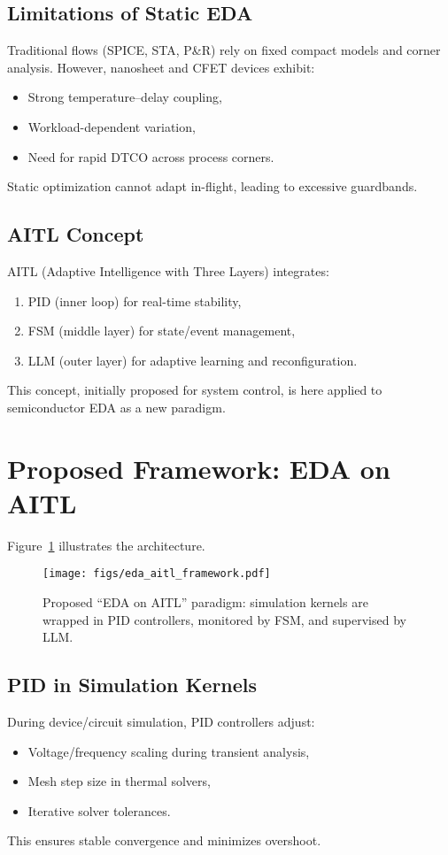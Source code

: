 \documentclass[conference]{IEEEtran}
\begin{document}
\subsection{Limitations of Static EDA}
Traditional flows (SPICE, STA, P\&R) rely on fixed compact models and corner analysis. 
However, nanosheet and CFET devices exhibit:
\begin{itemize}
  \item Strong temperature–delay coupling,
  \item Workload-dependent variation,
  \item Need for rapid DTCO across process corners.
\end{itemize}
Static optimization cannot adapt in-flight, leading to excessive guardbands.

\subsection{AITL Concept}
AITL (Adaptive Intelligence with Three Layers) integrates:
\begin{enumerate}
  \item PID (inner loop) for real-time stability,
  \item FSM (middle layer) for state/event management,
  \item LLM (outer layer) for adaptive learning and reconfiguration.
\end{enumerate}
This concept, initially proposed for system control, 
is here applied to semiconductor EDA as a new paradigm.

\section{Proposed Framework: EDA on AITL}
Figure~\ref{fig:framework} illustrates the architecture.

\begin{figure}[h]
\centering
\texttt{[image: figs/eda\_aitl\_framework.pdf]}
\caption{Proposed ``EDA on AITL'' paradigm: 
simulation kernels are wrapped in PID controllers, 
monitored by FSM, and supervised by LLM.}
\label{fig:framework}
\end{figure}

\subsection{PID in Simulation Kernels}
During device/circuit simulation, PID controllers adjust:
\begin{itemize}
  \item Voltage/frequency scaling during transient analysis,
  \item Mesh step size in thermal solvers,
  \item Iterative solver tolerances.
\end{itemize}
This ensures stable convergence and minimizes overshoot.
\end{document}
